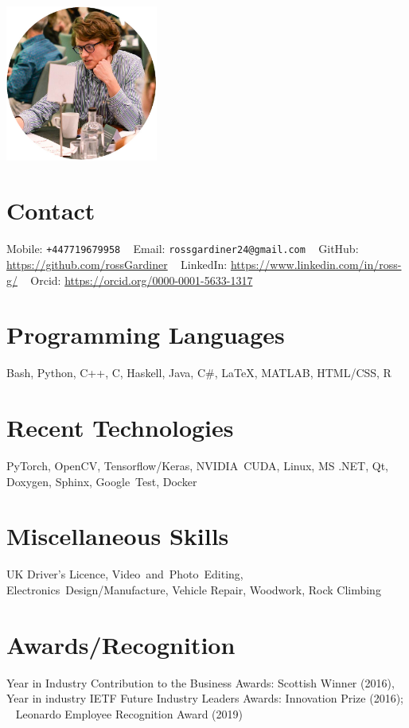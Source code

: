 \documentclass[a4paper]{cv-style}     %
\begin{document}
\lastupdated

\begin{aside}
\includegraphics[width=5cm]{p1000137-cropped.jpg}
\vspace{-0.3cm}
\section{Contact}
\vspace{0.1cm}Mobile: \texttt{+447719679958}
~
Email: \texttt{rossgardiner24@gmail.com}
~
GitHub: \url{https://github.com/rossGardiner}
~
LinkedIn: \url{https://www.linkedin.com/in/ross-g/}
~ 
Orcid: \url{https://orcid.org/0000-0001-5633-1317}
%

\section{Programming Languages}
Bash, Python, C++, C, Haskell, Java, C\#, \LaTeX, MATLAB, HTML/CSS, R
%
\section{Recent Technologies}
PyTorch, OpenCV, Tensorflow/Keras, NVIDIA~CUDA, Linux, MS .NET, Qt, Doxygen, Sphinx, Google~Test, Docker
\section{Miscellaneous Skills}
UK Driver's Licence, Video~and~Photo~Editing,
Electronics~Design/Manufacture, Vehicle Repair, Woodwork, Rock Climbing
\vspace{-0.2}
\section{Awards/Recognition}
Year in Industry Contribution to the Business Awards: Scottish Winner (2016),
~
Year in industry IETF Future Industry Leaders Awards: Innovation Prize (2016);
~
Leonardo Employee Recognition Award (2019)
\end{aside}
  \vspace{-0.4cm}
\end{document}
